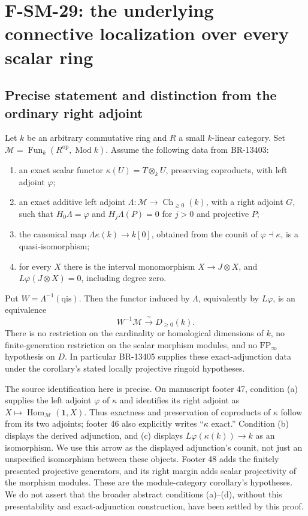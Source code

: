 \section{F-SM-29: the underlying connective localization over every scalar ring}

\subsection{Precise statement and distinction from the ordinary right adjoint}
Let \(k\) be an arbitrary commutative ring and \(R\) a small
\(k\)-linear category.  Set
\(\mathcal M=\operatorname{Fun}_k(R^{\mathrm{op}},\operatorname{Mod}k)\).
Assume the following data from BR-13403:
\begin{enumerate}
\item an exact scalar functor \(\kappa(U)=T\otimes_kU\), preserving
coproducts, with left adjoint \(\varphi\);
\item an exact additive left adjoint
\(\Lambda:\mathcal M\to\operatorname{Ch}_{\ge0}(k)\), with a right
adjoint \(G\), such that \(H_0\Lambda=\varphi\) and
\(H_j\Lambda(P)=0\) for \(j>0\) and projective \(P\);
\item the canonical map
\(\Lambda\kappa(k)\to k[0]\), obtained from the counit of
\(\varphi\dashv\kappa\), is a quasi-isomorphism;
\item for every \(X\) there is the interval monomorphism
\(X\to J\otimes X\), and
\(L\varphi(J\otimes X)=0\), including degree zero.
\end{enumerate}
Put \(W=\Lambda^{-1}(\mathrm{qis})\).  Then the functor induced by
\(\Lambda\), equivalently by \(L\varphi\), is an equivalence
\[
 W^{-1}\mathcal M\xrightarrow{\ \sim\ }D_{\ge0}(k).
 \tag{SM29.1}
\]
There is no restriction on the cardinality or homological dimensions
of \(k\), no finite-generation restriction on the scalar morphism
modules, and no \(\mathrm{FP}_\infty\) hypothesis on \(D\).
In particular BR-13405 supplies these exact-adjunction data under
the corollary's stated locally projective ringoid hypotheses.

The source identification here is precise.  On manuscript footer 47,
condition (a) supplies the left adjoint \(\varphi\) of \(\kappa\)
and identifies its right adjoint as
\(X\mapsto\operatorname{Hom}_{\mathcal M}(\mathbf1,X)\).
Thus exactness and preservation of coproducts of \(\kappa\) follow
from its two adjoints; footer 46 also explicitly writes
``\(\kappa\) exact.''  Condition (b) displays the derived adjunction,
and (c) displays \(L\varphi(\kappa(k))\to k\) as an isomorphism.
We use this arrow as the displayed adjunction's counit, not just an
unspecified isomorphism between these objects.  Footer 48 adds the
finitely presented projective generators, and its right margin adds
scalar projectivity of the morphism modules.  These are the
module-category corollary's hypotheses.  We do not assert that the
broader abstract conditions (a)--(d), without this presentability
and exact-adjunction construction, have been settled by this proof.

